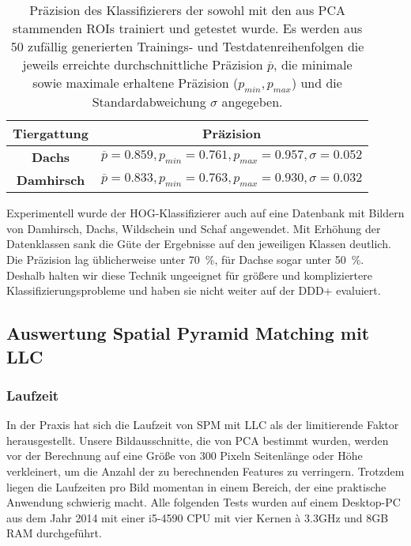 \begin{table}[]
	\centering
	\caption{Präzision des Klassifizierers der sowohl mit den aus PCA stammenden ROIs trainiert und getestet wurde. Es werden aus 50 zufällig generierten Trainings- und Testdatenreihenfolgen die jeweils erreichte durchschnittliche Präzision $\overline{p}$, die minimale sowie maximale erhaltene Präzision ($p_{min}, p_{max}$) und die Standardabweichung $\sigma$ angegeben. }
	\label{tab:HOG:ResultsAuto}
	\begin{tabular}{cl}
		\hline
		\textbf{Tiergattung} 	       & \multicolumn{1}{c}{\textbf{Präzision}}                                                                                                                                                  \\ \hline
		\textbf{Dachs}                         &$\overline{p}= 0.859, p_{min}=0.761, p_{max}=0.957, \sigma=0.052$ \\
		\textbf{Damhirsch}                &$\overline{p}=0.833, p_{min}=0.763, p_{max}=0.930, \sigma=0.032$ \\
		\hline
	\end{tabular}
\end{table}

Experimentell wurde der HOG-Klassifizierer auch auf eine Datenbank mit Bildern von Damhirsch, Dachs, Wildschein und Schaf angewendet. Mit Erhöhung der Datenklassen sank die Güte der Ergebnisse auf den jeweiligen Klassen deutlich. Die Präzision lag üblicherweise unter 70~\%, für Dachse sogar unter 50~\%. Deshalb halten wir diese Technik ungeeignet für größere und kompliziertere Klassifizierungsprobleme und haben sie nicht weiter auf der DDD+ evaluiert.

\subsection{Auswertung Spatial Pyramid Matching mit LLC}

\subsubsection{Laufzeit}

In der Praxis hat sich die Laufzeit von SPM mit LLC als der limitierende Faktor herausgestellt. Unsere Bildausschnitte, die von PCA bestimmt wurden, werden vor der Berechnung auf eine Größe von 300 Pixeln Seitenlänge oder Höhe verkleinert, um die Anzahl der zu berechnenden Features zu verringern. Trotzdem liegen die Laufzeiten pro Bild momentan in einem Bereich, der eine praktische Anwendung schwierig macht. Alle folgenden Tests wurden auf einem Desktop-PC aus dem Jahr 2014 mit einer i5-4590 CPU mit vier Kernen à 3.3GHz und 8GB RAM durchgeführt.

